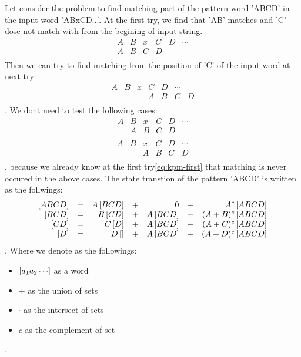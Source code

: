 \begin{observe}
Let consider the problem to find matching part of the pattern word 'ABCD' 
in the input word 'ABxCD...'. At the first try, we find that 'AB' matches
and 'C' dose not match with from the begining of input string.
\begin{equation}\label{eq:kpm-first}\begin{array}{ccc|cccc}
	A&B&x&C&D&\cdots \\
	A&B&C&D \\
\end{array}\end{equation}
Then we can try to find matching from the position of 'C' of the input word
at next try: 
\begin{equation}\label{eq:kpm-next}\begin{array}{cccc|ccc}
	A&B&x&C&D&\cdots\\
	&&&A&B&C&D \\
\end{array}\end{equation}
. We dont need to test the following cases:
\begin{equation}\begin{array}{cc|ccccc}
	A&B&x&C&D&\cdots\\
	&A&B&C&D \\
\end{array}\end{equation}
\begin{equation}\begin{array}{ccc|cccc}
	A&B&x&C&D&\cdots\\
	&&A&B&C&D \\
\end{array}\end{equation}
, because we already know at the first try\eqref{eq:kpm-first} that 
matching is never occured in the above cases.
The state transtion of the pattern 'ABCD' is written as the follwings:
\begin{equation}\begin{array}{rcrcrcr}
	\left[{ABCD}\right] &=& A\left[{BCD}\right] &+& 0 &+& A^c \left[{ABCD}\right] \\
	\left[{BCD}\right] &=& B\left[{CD}\right] &+& A\left[{BCD}\right] &+& (A+B)^c \left[{ABCD}\right] \\
	\left[{CD}\right] &=& C\left[{D}\right] &+& A\left[{BCD}\right] &+& (A+C)^c \left[{ABCD}\right] \\
	\left[{D}\right] &=& D\left[{}\right] &+& A\left[{BCD}\right] &+& (A+D)^c \left[{ABCD}\right] \\
\end{array}\end{equation}
. Where we denote as the followings:
\begin{itemize}
	\item $\left[{a_1a_2\cdots}\right]$ as a word
	\item $+$ as the union of sets
	\item $\cdot$ as the intersect of sets
	\item $c$ as the complement of set
\end{itemize}
.
\end{observe}

